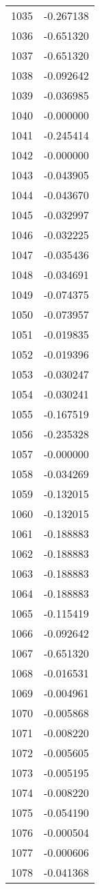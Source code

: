 \documentclass[12pt]{article}
\begin{document}
\begin{longtable}{@{}cc@{}}
1035 & -0.267138 \\
1036 & -0.651320 \\
1037 & -0.651320 \\
1038 & -0.092642 \\
1039 & -0.036985 \\
1040 & -0.000000 \\
1041 & -0.245414 \\
1042 & -0.000000 \\
1043 & -0.043905 \\
1044 & -0.043670 \\
1045 & -0.032997 \\
1046 & -0.032225 \\
1047 & -0.035436 \\
1048 & -0.034691 \\
1049 & -0.074375 \\
1050 & -0.073957 \\
1051 & -0.019835 \\
1052 & -0.019396 \\
1053 & -0.030247 \\
1054 & -0.030241 \\
1055 & -0.167519 \\
1056 & -0.235328 \\
1057 & -0.000000 \\
1058 & -0.034269 \\
1059 & -0.132015 \\
1060 & -0.132015 \\
1061 & -0.188883 \\
1062 & -0.188883 \\
1063 & -0.188883 \\
1064 & -0.188883 \\
1065 & -0.115419 \\
1066 & -0.092642 \\
1067 & -0.651320 \\
1068 & -0.016531 \\
1069 & -0.004961 \\
1070 & -0.005868 \\
1071 & -0.008220 \\
1072 & -0.005605 \\
1073 & -0.005195 \\
1074 & -0.008220 \\
1075 & -0.054190 \\
1076 & -0.000504 \\
1077 & -0.000606 \\
1078 & -0.041368 \\

\end{longtable}
\end{document}
